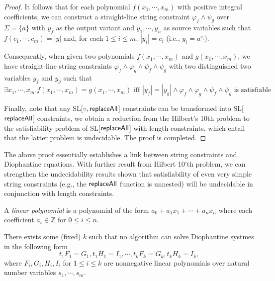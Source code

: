 \begin{proof}
It follows that for each polynomial $f(x_1, \cdots, x_m)$ with positive integral coefficients, we can construct a straight-line string constraint $\varphi_{f}\wedge\psi_g$ over $\Sigma=\{a\}$ with $y_f$ as the output variant and $y_1, \cdots, y_n$ as source variables such that
$f(c_1, \cdots, c_m)=|y|$ and, for each $1\leq i\leq m$, $|y_i|= c_i$ (i.e., $y_i=a^{c_i}$).  

Consequently, when given two polynomials $f(x_1, \cdots, x_m)$ and $g(x_1, \cdots, x_m)$, we have straight-line string constraints $\varphi_{f}\wedge \varphi_{g}\wedge \psi_{f}\wedge \psi_g$ with two distinguished two variables  $y_f$ and $y_g$ such that  
\[\exists x_1, \cdots, x_m. f(x_1, \cdots, x_m)=g(x_1, \cdots, x_m)\mbox{ iff } |y_f|=|y_g|\wedge \varphi_{f}\wedge \varphi_{g}\wedge \psi_{f}\wedge \psi_g\mbox{ is satisfiable} \]

Finally, note that any  SL[$\circ, \mathsf{replaceAll}$] constraints can be transformed into SL[$\mathsf{replaceAll}$] constraints, we obtain a reduction from the Hilbert's 10th problem to the satisfiability problem of  SL[$\mathsf{replaceAll}$] with length constraints, which entail that the latter problem is undecidable. The proof is completed. 
\end{proof}

The above proof essentially establishes a link between string constraints and Diophantine equations. With further result from Hilbert 10'th problem, we can strengthen the undecidability results shown that satisfiability of even very simple string constraints (e.g., the $\mathsf{replaceAll}$ function is unnested) will be undecidable in conjunction with length constraints. 
 
A \emph{linear polynomial} is a polynomial of the form $a_0 + a_1x_1 + \cdots + a_n x_n$ where
each coefficient $a_i\in \mathbb{Z}$  for $0 \leq i \leq n$. 

\begin{theorem}[\cite{ID02}]
	There exists some (fixed) $k$ such that no algorithm can solve Diophantine systmes in the following form
	\[t_1F_1=G_1, t_1H_1=I_1, \cdots, t_kF_k = G_k, t_kH_k = I_k,\] 
	where $F_i, G_i, H_i, I_i$ for $1\leq i\leq k$ are nonnegative linear polynomials over natural number variables  $s_1, \cdots, s_m$.
\end{theorem}

